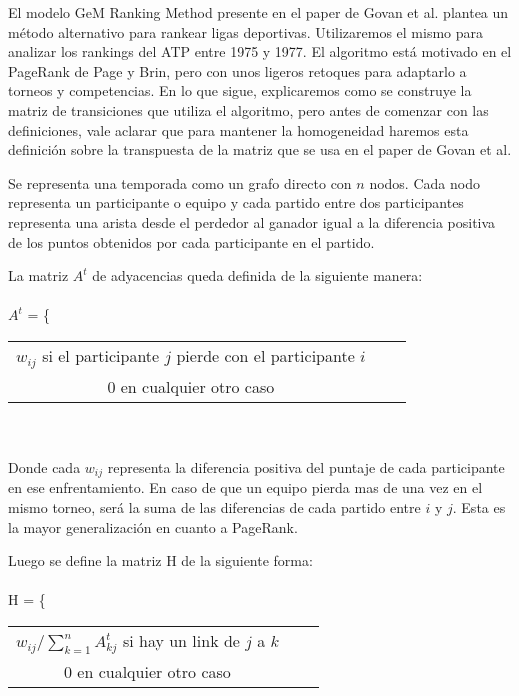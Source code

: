 El modelo GeM Ranking Method presente en el paper de Govan et al. plantea un método alternativo para rankear ligas deportivas. Utilizaremos el mismo para analizar los rankings del ATP entre 1975 y 1977. El algoritmo está motivado en el PageRank de Page y Brin, pero con unos ligeros retoques para adaptarlo a torneos y competencias.
En lo que sigue, explicaremos como se construye la matriz de transiciones que utiliza el algoritmo, pero antes de comenzar con las definiciones, vale aclarar que para mantener la homogeneidad haremos esta definición sobre la transpuesta de la matriz que se usa en el paper de Govan et al.

Se representa una temporada como un grafo directo con $n$ nodos. Cada nodo representa un participante o equipo y cada partido entre dos participantes representa una arista desde el perdedor al ganador igual a la diferencia positiva de los puntos obtenidos por cada participante en el partido.

La matriz $A^t$ de adyacencias queda definida de la siguiente manera: 
\\\\
$A^t$ = \Bigg\{
  \begin{tabular}{ccc}
  $w_{ij}$ si el participante $j$ pierde con el participante $i$ \\
  0 en cualquier otro caso 
  \end{tabular}
\\\\
Donde cada $w_{ij}$ representa la diferencia positiva del puntaje de cada participante en ese enfrentamiento. En caso de que un equipo pierda mas de una vez en el mismo torneo, será la suma de las diferencias de cada partido entre $i$ y $j$. Esta es la mayor generalización en cuanto a PageRank.

Luego se define la matriz H de la siguiente forma:
\\\\
H = \Bigg\{
  \begin{tabular}{ccc}
  $w_{ij} / \sum\limits_{k=1}^n A^t_{kj} $ si hay un link de $j$ a $k$ \\
  0 en cualquier otro caso 
  \end{tabular}
\\\\

